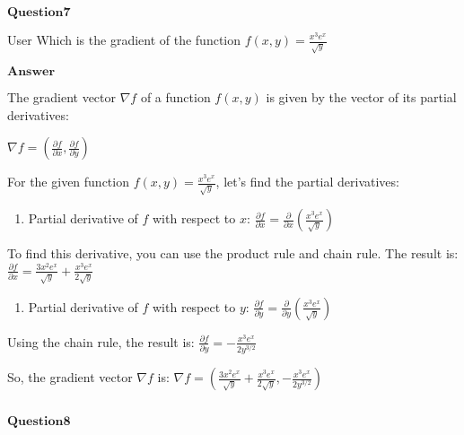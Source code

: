 \documentclass[11pt]{article}
\makeatletter
\providecommand{\tightlist}{%
      \setlength{\itemsep}{0pt}\setlength{\parskip}{0pt}}
\newcommand{\boxspacing}{\kern\kvtcb@left@rule\kern\kvtcb@boxsep}
\newcommand{\prompt}[4]{
        {\ttfamily\llap{{\color{#2}[#3]:\hspace{3pt}#4}}\vspace{-\baselineskip}}
    }
\makeatother
\begin{document}
    $\textbf{Question7}$

User Which is the gradient of the function
$f(x,y) = \frac{x^{3} e^{x}}{\sqrt{y}}$

$\textbf{Answer}$

    The gradient vector $ \nabla f $ of a function $ f(x, y) $ is given
by the vector of its partial derivatives:

$ \nabla f = \left( \frac{\partial f}{\partial x},
\frac{\partial f}{\partial y} \right) $

For the given function $ f(x, y) = \frac{x^3 e^x}{\sqrt{y}} $, let's
find the partial derivatives:

\begin{enumerate}
\def\labelenumi{\arabic{enumi}.}
\tightlist
\item
  Partial derivative of $ f $ with respect to $ x $: $
  \frac{\partial f}{\partial x} =
  \frac{\partial}{\partial x}\left(\frac{x^3 e^x}{\sqrt{y}}\right) $
\end{enumerate}

To find this derivative, you can use the product rule and chain rule.
The result is: $ \frac{\partial f}{\partial x} =
\frac{3x^2 e^x}{\sqrt{y}} + \frac{x^3 e^x}{2\sqrt{y}} $

\begin{enumerate}
\def\labelenumi{\arabic{enumi}.}
\setcounter{enumi}{1}
\tightlist
\item
  Partial derivative of $ f $ with respect to $ y $: $
  \frac{\partial f}{\partial y} =
  \frac{\partial}{\partial y}\left(\frac{x^3 e^x}{\sqrt{y}}\right) $
\end{enumerate}

Using the chain rule, the result is: $ \frac{\partial f}{\partial y} =
-\frac{x^3 e^x}{2y^{3/2}} $

So, the gradient vector $ \nabla f $ is: $ \nabla f = \left(
\frac{3x^2 e^x}{\sqrt{y}} + \frac{x^3 e^x}{2\sqrt{y}},
-\frac{x^3 e^x}{2y^{3/2}} \right) $

    \begin{tcolorbox}[breakable, size=fbox, boxrule=1pt, pad at break*=1mm,colback=cellbackground, colframe=cellborder]
\prompt{In}{incolor}{ }{\boxspacing}
\begin{Verbatim}[commandchars=\\\{\}]

\end{Verbatim}
\end{tcolorbox}

    $\textbf{Question8}$
\end{document}
